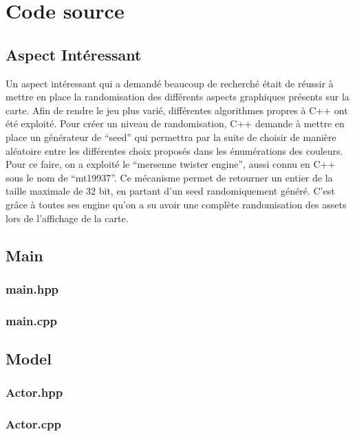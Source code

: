 \section{Code source}

\subsection{Aspect Intéressant}
Un aspect intéressant qui a demandé beaucoup de recherché était de réussir à mettre en place la randomisation des différents aspects graphiques présents sur la carte.
Afin de rendre le jeu plus varié, différentes algorithmes propres à C++ ont été exploité.
Pour créer un niveau de randomisation, C++ demande à mettre en place un générateur de \enquote{seed} qui permettra par la suite de choisir de manière aléatoire entre les différentes choix proposés dans les énumérations des couleurs.
Pour ce faire, on a exploité le \enquote{mersenne twister engine}, aussi connu en C++ sous le nom de \enquote{mt19937}.
Ce mécanisme permet de retourner un entier de la taille maximale de 32 bit, en partant d'un seed randomiquement généré.
C'est grâce à toutes ses engine qu'on a su avoir une complète randomisation des assets lors de l'affichage de la carte.

\subsection{Main}
\subsubsection{main.hpp}

\subsubsection{main.cpp}


\subsection{Model}
\subsubsection{Actor.hpp}

\subsubsection{Actor.cpp}

